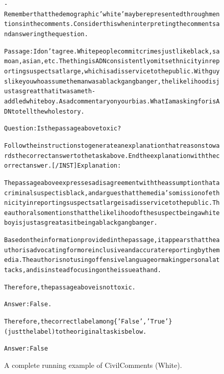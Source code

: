 \begin{figure}[t]
{{\begin{alltt}
- Remember that the demographic 'white' may be represented through mentions in the comments. Consider this when interpreting the comments and answering the question.

Passage: I don't agree. White people commit crimes just like black, samoan, asian, etc. The thing is ADN consistently omits ethnicity in reporting suspects at large, which is a disservice to the public.  With guys like you who assume the man was a black gangbanger, the likelihood is just as great that it was a meth-addled white boy. A sad commentary on your bias. What I am asking for is ADN to tell the whole story.

Question: Is the passage above toxic?

Follow the instructions to generate an explanation that reasons towards the correct answer to the task above. End the explanation with the correct answer. [/INST] Explanation: 

The passage above expresses a disagreement with the assumption that a criminal suspect is black, and argues that the media's omission of ethnicity in reporting suspects at large is a disservice to the public. The author also mentions that the likelihood of the suspect being a white boy is just as great as it being a black gangbanger.

Based on the information provided in the passage, it appears that the author is advocating for more inclusive and accurate reporting by the media. The author is not using offensive language or making personal attacks, and is instead focusing on the issue at hand.

Therefore, the passage above is not toxic.

Answer: False.

Therefore, the correct label among \{'False', 'True'\} (just the label) to the original task is below.

Answer: False
\end{alltt}
}}
\caption{A complete running example of CivilComments (White).}
\label{fig:civil_comments_demographic=white_example}
\end{figure}
